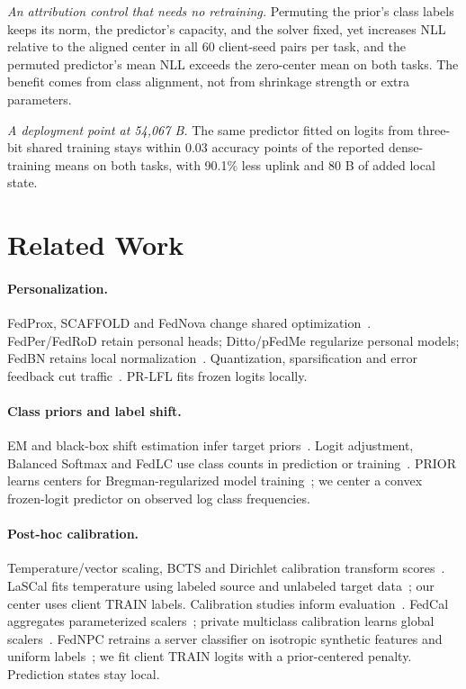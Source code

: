 \emph{An attribution control that needs no retraining.} Permuting the prior's class labels keeps its norm, the predictor's capacity, and the solver fixed, yet increases NLL relative to the aligned center in all 60 client-seed pairs per task, and the permuted predictor's mean NLL exceeds the zero-center mean on both tasks. The benefit comes from class alignment, not from shrinkage strength or extra parameters.

\emph{A deployment point at 54,067 B.} The same predictor fitted on logits from three-bit shared training stays within 0.03 accuracy points of the reported dense-training means on both tasks, with 90.1\% less uplink and 80 B of added local state.

\section{Related Work}
\paragraph{Personalization.}
FedProx, SCAFFOLD and FedNova change shared optimization~\cite{li2020fedprox,karimireddy2020scaffold,wang2020fednova}. FedPer/FedRoD retain personal heads; Ditto/pFedMe regularize personal models; FedBN retains local normalization~\cite{li2021ditto,dinh2020pfedme,li2021fedbn}. Quantization, sparsification and error feedback cut traffic~\cite{alistarh2017qsgd,stich2018sparsified,karimireddy2019errorfeedback}. PR-LFL fits frozen logits locally.

\paragraph{Class priors and label shift.}
EM and black-box shift estimation infer target priors~\cite{saerens2002prior,lipton2018bbse}. Logit adjustment, Balanced Softmax and FedLC use class counts in prediction or training~\cite{menon2021logitadjust,ren2020balanced,zhang2022fedlc}. PRIOR learns centers for Bregman-regularized model training~\cite{shi2023prior}; we center a convex frozen-logit predictor on observed log class frequencies.

\paragraph{Post-hoc calibration.}
Temperature/vector scaling, BCTS and Dirichlet calibration transform scores~\cite{guo2017calibration,alexandari2020labelshift,kull2019dirichlet}. LaSCal fits temperature using labeled source and unlabeled target data~\cite{popordanoska2024lascal}; our center uses client TRAIN labels. Calibration studies inform evaluation~\cite{vaicenavicius2019calibration,kumar2019verified,ovadia2019shift}. FedCal aggregates parameterized scalers~\cite{peng2024fedcal}; private multiclass calibration learns global scalers~\cite{maddock2025privatecal}. FedNPC retrains a server classifier on isotropic synthetic features and uniform labels~\cite{gao2026fednpc}; we fit client TRAIN logits with a prior-centered penalty. Prediction states stay local.
